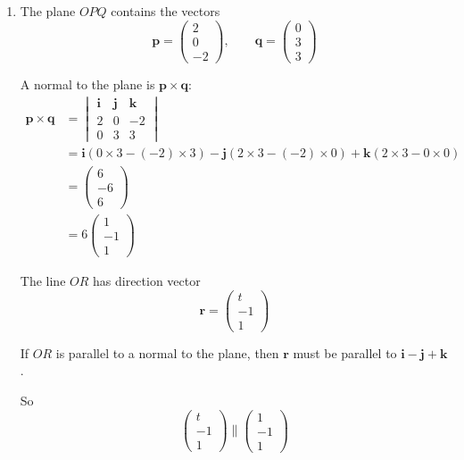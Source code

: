 \documentclass[leqno]{article}
\begin{document}
\begin{enumerate}[
  label=\textbf{\arabic*.},
  leftmargin=*,
  topsep=0pt,
  partopsep=0pt,
  parsep=0pt
]
\vspace*{10pt}

\begin{djsSolution}
\begin{enumerate}[label=\textbf{(\alph*)}]
  \item The plane $OPQ$ contains the vectors
\[
\mathbf p=\begin{pmatrix}2\\0\\-2\end{pmatrix},
\qquad
\mathbf q=\begin{pmatrix}0\\3\\3\end{pmatrix}
\]

A normal to the plane is $\mathbf p\times \mathbf q$:
\begin{align*}
\mathbf p\times \mathbf q
&=
\begin{vmatrix}
\mathbf i & \mathbf j & \mathbf k\\
2&0&-2\\
0&3&3
\end{vmatrix} \\
&= \mathbf i(0\times 3-(-2)\times 3)-\mathbf j(2\times 3-(-2)\times 0)+\mathbf k(2\times 3-0\times 0) \\
&= \begin{pmatrix}6\\-6\\6\end{pmatrix} \\
&= 6\begin{pmatrix}1\\-1\\1\end{pmatrix}
\end{align*}

The line $OR$ has direction vector
\[
\mathbf r=\begin{pmatrix}t\\-1\\1\end{pmatrix}
\]

If $OR$ is parallel to a normal to the plane, then $\mathbf r$ must be parallel to $\mathbf i-\mathbf j+\mathbf k$.

So
\[
\begin{pmatrix}t\\-1\\1\end{pmatrix}\parallel \begin{pmatrix}1\\-1\\1\end{pmatrix}
\]


\end{enumerate}
\end{djsSolution}
\end{enumerate}
\end{document}
